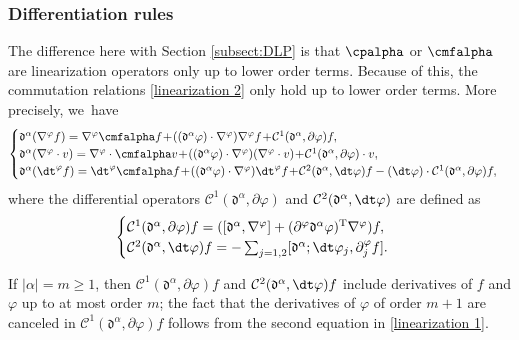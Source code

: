 \subsubsection{Differentiation rules} \label{sectdiffrules}
The difference here with Section \ref{subsect:DLP} is that $\cpalpha$ or $\cmfalpha$ are linearization operators only up to lower order terms.
Because of this, the commutation relations \eqref{linearization 2} only hold up to lower order terms. More precisely, we~have
\begin{equation}\label{comrules2}
\begin{cases}
\mathfrak{d}^\alpha(\nabla^\varphi f)
= \nabla^\varphi \cmfalpha f \!+\! ((\mathfrak{d}^\alpha\varphi)\cdot\nabla^\varphi)\nabla^\varphi f \!+\!{\mathcal C}^1(\mathfrak{d}^\alpha,\partial \varphi) f, \\
\mathfrak{d}^\alpha(\nabla^\varphi\cdot v)
= \nabla^\varphi\cdot \cmfalpha v
\!+\! ((\mathfrak{d}^\alpha\varphi)\cdot\nabla^\varphi)(\nabla^\varphi\cdot v) \!+\!{\mathcal C}^1(\mathfrak{d}^\alpha,\partial \varphi)\cdot v, \\
\mathfrak{d}^\alpha(\dt^\varphi f)
= \dt^\varphi \cmfalpha f\!+\! ((\mathfrak{d}^\alpha\varphi)\cdot\nabla^\varphi)\dt^\varphi f \!+\!
{\mathcal C}^2(\mathfrak{d}^\alpha,\dt \varphi) f
- (\dt\varphi)\cdot {\mathcal C}^1(\mathfrak{d}^\alpha,\partial \varphi)f,
\end{cases}
\end{equation}
where the differential operators ${\mathcal C}^1(\mathfrak{d}^\alpha,\partial \varphi)$ and ${\mathcal C}^2(\mathfrak{d}^\alpha,\dt \varphi)$ are defined as
\begin{equation}\label{defcomC}
\begin{cases}
{\mathcal C}^1(\mathfrak{d}^\alpha,\partial \varphi) f
= ([\mathfrak{d}^\alpha,\nabla^\varphi]+(\partial^\varphi\mathfrak{d}^\alpha\varphi)^\mathrm{T}\nabla^\varphi)f, \\
{\mathcal C}^2(\mathfrak{d}^\alpha,\dt \varphi) f
= - \textstyle\sum_{j=1,2}[\mathfrak{d}^\alpha; \dt\varphi_j,\partial_j^\varphi f].
\end{cases}
\end{equation}

\begin{remark}\label{remC1C2}
If $|\alpha|=m\geq1$, then ${\mathcal C}^1(\mathfrak{d}^\alpha,\partial \varphi) f$
and ${\mathcal C}^2(\mathfrak{d}^\alpha,\dt \varphi) f$ include derivatives of $f$ and $\varphi$ up to at most order $m$;
the fact that the derivatives of $\varphi$ of order $m+1$ are canceled in ${\mathcal C}^1(\mathfrak{d}^\alpha,\partial \varphi) f$
follows from the second equation in \eqref{linearization 1}.
\end{remark}

